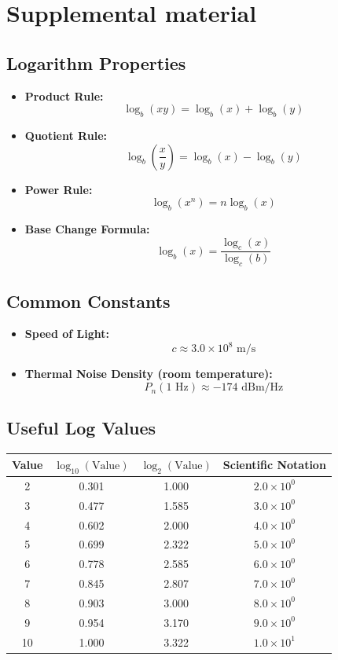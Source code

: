 \newpage
\section{Supplemental material}
\subsection{Logarithm Properties}
\begin{itemize}
    \item \textbf{Product Rule:}
    \[
    \log_b (xy) = \log_b (x) + \log_b (y)
    \]
    \item \textbf{Quotient Rule:}
    \[
    \log_b \left( \frac{x}{y} \right) = \log_b (x) - \log_b (y)
    \]
    \item \textbf{Power Rule:}
    \[
    \log_b (x^n) = n \log_b (x)
    \]
    \item \textbf{Base Change Formula:}
    \[
    \log_b (x) = \frac{\log_c (x)}{\log_c (b)}
    \]
\end{itemize}

\subsection{Common Constants}
\begin{itemize}
    \item \textbf{Speed of Light:}
    \[
    c \approx 3.0 \times 10^8 \text{ m/s}
    \]
    \item \textbf{Thermal Noise Density (room temperature):}
    \[
    P_n (1 \text{ Hz}) \approx -174 \text{ dBm/Hz}
    \]
\end{itemize}

\subsection{Useful Log Values}
\begin{table}[h]
    \centering
    \renewcommand{\arraystretch}{1.2}
    \begin{tabular}{|c|c|c|c|}
        \hline
        Value & $\log_{10}(\text{Value})$ & $\log_{2}(\text{Value})$ & Scientific Notation \\
        \hline
        2 & 0.301 & 1.000 & $2.0 \times 10^0$ \\
        3 & 0.477 & 1.585 & $3.0 \times 10^0$ \\
        4 & 0.602 & 2.000 & $4.0 \times 10^0$ \\
        5 & 0.699 & 2.322 & $5.0 \times 10^0$ \\
        6 & 0.778 & 2.585 & $6.0 \times 10^0$ \\
        7 & 0.845 & 2.807 & $7.0 \times 10^0$ \\
        8 & 0.903 & 3.000 & $8.0 \times 10^0$ \\
        9 & 0.954 & 3.170 & $9.0 \times 10^0$ \\
        10 & 1.000 & 3.322 & $1.0 \times 10^1$ \\
        \hline
    \end{tabular}
\end{table}

